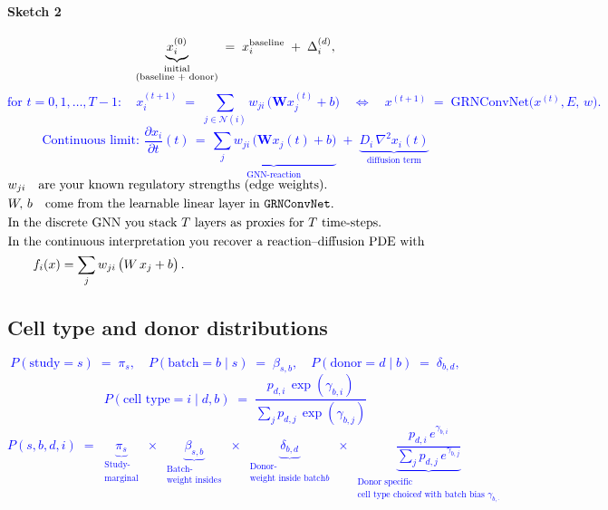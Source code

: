 \documentclass{article}
\newcommand{\gpt}[1]{\textcolor{blue}{#1}}
\begin{document}
\paragraph{Sketch 2}

\gpt{\[
	\underbrace{x_i^{(0)}}_{\substack{\text{initial}\\\text{(baseline + donor)}}}
	\;=\;
	x_i^{\rm baseline} \;+\;\Delta_i^{(d)},
	\]
	\[
	\text{for }t=0,1,\dots,T-1:\quad
	x_i^{(t+1)}
	\;=\;
	\sum_{j\in\mathcal N(i)}
	w_{ji}\,\bigl(\mathbf{W}x_j^{(t)} + b\bigr)
	\quad\Longleftrightarrow\quad
	x^{(t+1)} \;=\; \mathrm{GRNConvNet}\bigl(x^{(t)},E,\,w\bigr).
	\]
	\[
	\boxed{
		\text{Continuous limit: }
		\frac{\partial x_i}{\partial t}(t)
		\,=\,
		\underbrace{\sum_{j}w_{ji}\,\bigl(\mathbf{W}x_j(t)+b\bigr)}_{\text{GNN‐reaction}}
		\;+\;
		\underbrace{D_i\,\nabla^2x_i(t)}_{\text{diffusion term}}
	}
	\]
	$
	\begin{aligned}
		& w_{ji} \quad\text{are your known regulatory strengths (edge weights).}\\
		& W,\,b \quad\text{come from the learnable linear layer in \texttt{GRNConvNet}.}\\
		& \text{In the discrete GNN you stack }T\text{ layers as proxies for }T\text{ time‐steps.}\\
		& \text{In the continuous interpretation you recover a reaction–diffusion PDE with}\\
		& \qquad f_i(x)
		= \sum_{j} w_{ji}\,\bigl(W\,x_{j} + b\bigr)\,.  
	\end{aligned}$
}

\subsection{Cell type and donor distributions}

\gpt{
\[
P(\text{study}=s) \;=\; \pi_s,
\quad
P(\text{batch}=b \mid s) \;=\; \beta_{s,b},
\quad
P(\text{donor}=d \mid b) \;=\; \delta_{b,d},
\]
\[
P(\text{cell type}=i \mid d,b)
\;=\;
\frac{\,p_{d,i}\,\exp(\gamma_{b,i})\,}{\sum_{j}p_{d,j}\,\exp(\gamma_{b,j})}
\]
\[
\boxed{
	P(s,b,d,i)
	\;=\;
	\underbrace{\pi_s}_{\substack{\text{Study-}\\\text{marginal}}}
	\;\times\;
	\underbrace{\beta_{s,b}}_{\substack{\text{Batch-}\\\text{weight inside}s}}
	\;\times\;
	\underbrace{\delta_{b,d}}_{\substack{\text{Donor-}\\\text{weight inside batch}b}}
	\;\times\;
	\underbrace{\frac{p_{d,i}\,e^{\gamma_{b,i}}}{\sum_{j}p_{d,j}\,e^{\gamma_{b,j}}}}_{\substack{\text{Donor specific}\\\text{cell type choice}d\text{ with batch bias }\gamma_{b,\cdot}}}
}
\]
}
\end{document}
